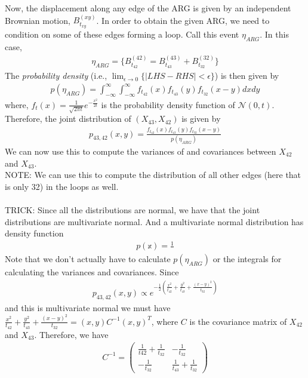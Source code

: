 Now, the displacement along any edge of the ARG is given by an independent Brownian motion, $B_{t_{xy}}^{(xy)}$. In order to obtain the given ARG, we need to condition on some of these edges forming a loop. Call this event $\eta_{ARG}$. In this case, 
\begin{eqnarray}
\eta_{ARG} = \{ B_{t_{42}}^{(42)} = B_{t_{43}}^{(43)} + B_{t_{32}}^{(32)}  \}
\end{eqnarray}
The \textit{probability density} (i.e., $\displaystyle \lim_{\epsilon \rightarrow 0} \{| LHS - RHS | < \epsilon\} $) is then given by 
\begin{eqnarray}
p(\eta_{ARG}) = \int_{-\infty}^{\infty} \int_{-\infty}^{\infty} f_{t_{42}}(x)f_{t_{43}}(y)f_{t_{32}}(x-y) dx dy
\end{eqnarray}
where, $f_t(x) = \frac{1}{\sqrt{2 \pi t}} e^{-\frac{x^2}{2t}}$ is the probability density function of $\mathcal{N}(0,t)$.\\
Therefore, the joint distribution of $(X_{43},X_{42})$ is given by 
\begin{eqnarray}
p_{43,42}(x,y) = \frac{f_{t_{42}}(x)f_{t_{43}}(y)f_{t_{32}}(x-y)}{p(\eta_{ARG})}
\end{eqnarray}
We can now use this to compute the variances of and covariances between $X_{42}$ and $X_{43}$.\\
NOTE: We can use this to compute the distribution of all other edges (here that is only 32) in the loops as well.\\ \\
TRICK: Since all the distributions are normal, we have that the joint distributions are multivariate normal. And a multivariate normal distribution has density function
\begin{eqnarray}
p(\mathbb{x}) = \frac{1}{}
\end{eqnarray}
Note that we don't actually have to calculate $p(\eta_{ARG})$ or the integrals for calculating the variances and covariances. Since
\begin{eqnarray}
p_{43,42}(x,y) \propto {e^{-\frac{1}{2} ( \frac{x^2}{t_{42}} + \frac{y^2}{t_{43}} + \frac{(x-y)^2}{t_{32}}  ) }}
\end{eqnarray}
and this is multivariate normal we must have $ \frac{x^2}{t_{42}} + \frac{y^2}{t_{43}} + \frac{(x-y)^2}{t_{32}} = (x,y)C^{-1}(x,y)^T$, where $C$ is the covariance matrix of $X_{42}$ and $X_{43}$. Therefore, we have 
\begin{eqnarray}
C^{-1} = \begin{pmatrix}
\frac{1}{t42} + \frac{1}{t_{32}} & -\frac{1}{t_{32}} \\
-\frac{1}{t_{32}} & \frac{1}{t_{43}}+\frac{1}{t_{32}} 
\end{pmatrix}
\end{eqnarray}


